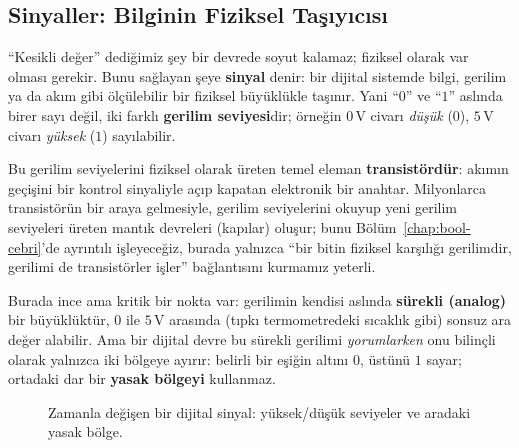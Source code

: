 \subsection{Sinyaller: Bilginin Fiziksel Taşıyıcısı}
\label{sec:sinyaller}

``Kesikli değer'' dediğimiz şey bir devrede soyut kalamaz; fiziksel olarak var olması gerekir.
Bunu sağlayan şeye \textbf{sinyal} denir: bir dijital sistemde bilgi, gerilim ya
da akım gibi ölçülebilir bir fiziksel büyüklükle taşınır. Yani ``$0$'' ve ``$1$'' aslında birer
sayı değil, iki farklı \textbf{gerilim seviyesi}dir; örneğin $0\,$V
civarı \emph{düşük} ($0$), $5\,$V civarı \emph{yüksek} ($1$) sayılabilir.

Bu gerilim seviyelerini fiziksel olarak üreten temel eleman \textbf{transistördür}:
akımın geçişini bir kontrol sinyaliyle açıp kapatan elektronik bir anahtar. Milyonlarca
transistörün bir araya gelmesiyle, gerilim seviyelerini okuyup yeni gerilim seviyeleri üreten
mantık devreleri (kapılar) oluşur; bunu Bölüm~\ref{chap:bool-cebri}'de ayrıntılı işleyeceğiz,
burada yalnızca ``bir bitin fiziksel karşılığı gerilimdir, gerilimi de transistörler işler''
bağlantısını kurmamız yeterli.

Burada ince ama kritik bir nokta var: gerilimin kendisi aslında \textbf{sürekli (analog)} bir
büyüklüktür, $0$ ile $5\,$V arasında (tıpkı termometredeki sıcaklık gibi) sonsuz ara değer
alabilir. Ama bir dijital devre bu sürekli gerilimi \emph{yorumlarken} onu bilinçli olarak
yalnızca iki bölgeye ayırır: belirli bir eşiğin altını $0$, üstünü $1$ sayar; ortadaki dar bir
\textbf{yasak bölgeyi} kullanmaz.

\begin{figure}[H]
\centering
{}
\caption{Zamanla değişen bir dijital sinyal: yüksek/düşük seviyeler ve aradaki yasak bölge.}
\label{fig:sinyal-zaman}
\end{figure}

